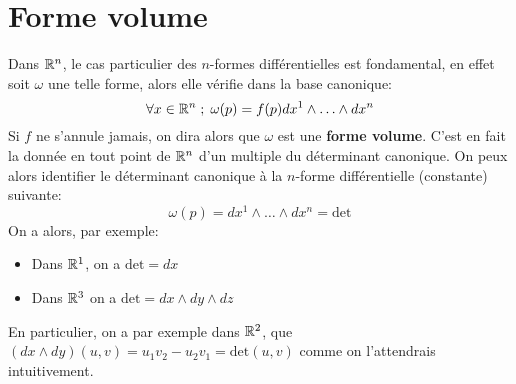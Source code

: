    \section{Forme volume}
   Dans \(\mathbb{R}^n\), le cas particulier des \(n\)-formes différentielles est fondamental, en effet soit \( \omega \) une telle forme, alors elle vérifie dans la base canonique:
   \[ 
      \forall x \in \mathbb{R}^n \; ; \; \omega(p) =  f(p)dx^1 \wedge \ldots \wedge dx^n
   \]
   Si \( f \) ne s'annule jamais, on dira alors que \( \omega \) est une \textbf{forme volume}. C'est en fait la donnée en tout point de \( \mathbb{R}^n \) d'un multiple du déterminant canonique. On peux alors identifier le déterminant canonique à la \( n \)-forme différentielle (constante) suivante:
   \[ 
      \omega(p) = dx^1 \wedge \ldots \wedge dx^n = \text{det}
   \]
   On a alors, par exemple:
   \begin{itemize}
      \item Dans \(\mathbb{R}^1\), on a \(\text{det} = dx\)
      \item Dans \(\mathbb{R}^3\) on a \(\text{det} = dx \wedge dy \wedge dz\)
   \end{itemize}
   En particulier, on a par exemple dans \(\mathbb{R}^2\), que \((dx \wedge dy)(u, v) = u_1v_2 - u_2v_1 = \text{det}(u, v)\) comme on l'attendrais intuitivement.
